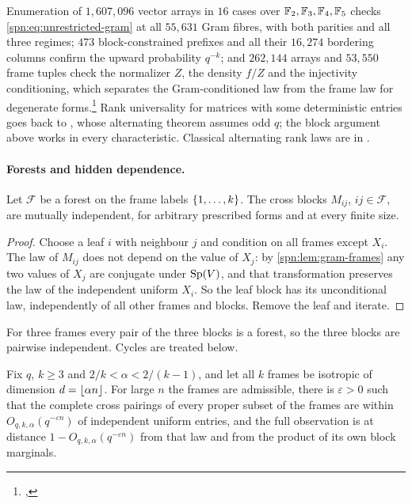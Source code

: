 Enumeration of $1{,}607{,}096$ vector arrays in $16$ cases over $\mathbb{F}_2,\mathbb{F}_3,\mathbb{F}_4,\mathbb{F}_5$ checks
\eqref{spn:eq:unrestricted-gram} at all $55{,}631$ Gram fibres, with both parities and all three
regimes; $473$ block-constrained prefixes and all their $16{,}274$ bordering columns confirm the
upward probability $q^{-k}$; and $262{,}144$ arrays and $53{,}550$ frame tuples check the normalizer
$Z$, the density $f/Z$ and the injectivity conditioning, which separates the Gram-conditioned law
from the frame law for degenerate
forms.\footnote{\raggedright{},
}
Rank universality for matrices with some deterministic entries goes back to
\cite{KoenigNguyen2022Rank}, whose alternating theorem assumes odd $q$; the block argument above
works in every characteristic. Classical alternating rank laws are in \cite{Fulman2015Stein}.

\paragraph{Forests and hidden dependence.}

\begin{theorem}\label{spn:thm:forest}
Let $\mathcal F$ be a forest on the frame labels $\{1,\dots,k\}$. The cross blocks $M_{ij}$,
$ij\in\mathcal F$, are mutually independent, for arbitrary prescribed forms and at every finite size.
\end{theorem}

\begin{proof}
Choose a leaf $i$ with neighbour $j$ and condition on all frames except $X_i$. The law of $M_{ij}$
does not depend on the value of $X_j$: by \cref{spn:lem:gram-frames} any two values of $X_j$ are
conjugate under $\operatorname{Sp}(V)$, and that transformation preserves the law of the independent uniform
$X_i$. So the leaf block has its unconditional law, independently of all other frames and blocks.
Remove the leaf and iterate.
\end{proof}

For three frames every pair of the three blocks is a forest, so the three blocks are pairwise
independent. Cycles are treated below.

\begin{theorem}\label{spn:thm:hierarchy}
Fix $q$, $k\ge3$ and $2/k<\alpha<2/(k-1)$, and let all $k$ frames be isotropic of dimension
$d=\lfloor\alpha n\rfloor$. For large $n$ the frames are admissible, there is $\varepsilon>0$ such that the
complete cross pairings of every proper subset of the frames are within $O_{q,k,\alpha}(q^{-\varepsilon n})$
of independent uniform entries, and the full observation is at distance
$1-O_{q,k,\alpha}(q^{-\varepsilon n})$ from that law and from the product of its own block marginals.
\end{theorem}

